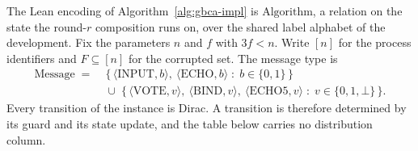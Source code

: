 The Lean encoding of Algorithm~\ref{alg:gbca-impl} is $\mathrm{Algorithm}$, a relation on the
state the round-$r$ composition runs on, over the shared label alphabet of the development.
Fix the parameters $n$ and $f$ with $3f < n$.
Write $[n]$ for the process identifiers and $F \subseteq [n]$ for the corrupted
set.
The message type is
\[ \begin{aligned}
     \mathrm{Message} \;=\;
     &\{\,\langle\mathrm{INPUT}, b\rangle,\ \langle\mathrm{ECHO}, b\rangle
       \;:\; b \in \{0,1\}\,\}\\
     &{}\cup\;
     \{\,\langle\mathrm{VOTE}, v\rangle,\ \langle\mathrm{BIND}, v\rangle,\
       \langle\mathrm{ECHO5}, v\rangle \;:\; v \in \{0,1,\bot\}\,\}.
   \end{aligned} \]
Every transition of the instance is Dirac.
A transition is therefore determined by its guard and its state update, and the table
below carries no distribution column.


